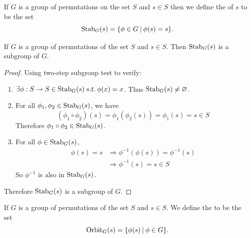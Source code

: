 \begin{definition}
    If $G$ is a group of permutations on the set $S$ and $s \in S$ then we define the  
    of $s$ to be the set 
    \[
    \operatorname{Stab}_G(s) = \{ \phi \in G \> | \> \phi(s) = s \}.
    \]
\end{definition}

\begin{lemma}
    If $G$ is a group of permutations of the set $S$ and $s \in S$. Then $\operatorname{Stab}_G(s)$ is a subgroup of $G$.
\end{lemma}
\begin{proof}
    Using two-step subgroup test to verify:
    \begin{enumerate}
        \item $\exists \phi: S \to S \in \operatorname{Stab}_G(s) \> s.t. \> \phi(x) = x$. Thus $\operatorname{Stab}_G(s) \neq \varnothing$.
        \item For all $\phi_1, \phi_2 \in \operatorname{Stab}_G(s)$, we have 
        \[
            (\phi_1 \circ \phi_2)(s) = \phi_1 \left( \phi_2(s) \right)
            = \phi_1(s) = s \in S
        \]
        Therefore $\phi_1 \circ \phi_2 \in \operatorname{Stab}_G(s)$.

        \item For all $\phi \in \operatorname{Stab}_G(s)$, 
        \begin{align*}
            \phi(s) = s &\Rightarrow \phi^{-1} \left( \phi (s) \right) = \phi^{-1}(s)\\
            &\Rightarrow \phi^{-1}(s) = s \in S
        \end{align*}
        So $\phi^{-1}$ is also in $\operatorname{Stab}_G(s)$.
    \end{enumerate}

    Therefore $\operatorname{Stab}_G(s)$ is a subgroup of $G$.
\end{proof}

\begin{definition}
    If $G$ is a group of permutations of the set $S$ and $s \in S$. We define the  to be the set
    \[
        \operatorname{Orbit}_G(s) = \{ \phi(s) \> | \> \phi \in G \}.
    \]
\end{definition}

